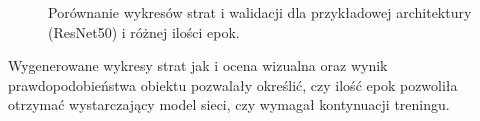 \begin{figure}[H]
    \hspace{2.4cm}
        \hfill
    \end{figure}
    \begin{figure}[H]\ContinuedFloat
    \centering
        \hfill
        \hfill
    \caption{Porównanie wykresów strat i walidacji dla przykładowej architektury (ResNet50) i różnej ilości epok.}
    \label{fig:epokaporownanie}
\end{figure}

\hspace{0.5cm}
Wygenerowane wykresy strat jak i ocena wizualna oraz wynik prawdopodobieństwa obiektu pozwalały określić, czy ilość epok pozwoliła otrzymać wystarczający model sieci, czy wymagał kontynuacji treningu.

